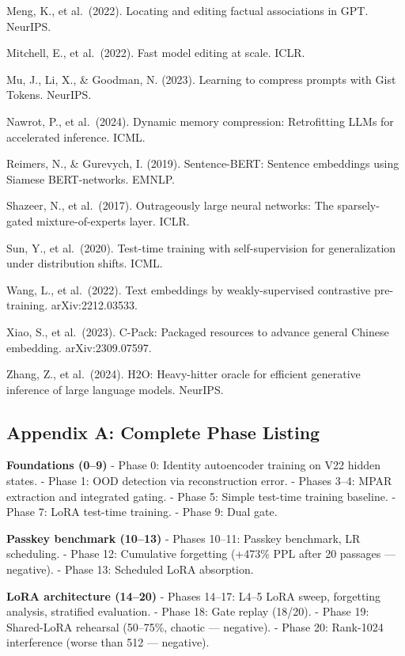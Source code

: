Meng, K., et al.~(2022). Locating and editing factual associations in GPT. NeurIPS.

Mitchell, E., et al.~(2022). Fast model editing at scale. ICLR.

Mu, J., Li, X., \& Goodman, N. (2023). Learning to compress prompts with Gist Tokens. NeurIPS.

Nawrot, P., et al.~(2024). Dynamic memory compression: Retrofitting LLMs for accelerated inference. ICML.

Reimers, N., \& Gurevych, I. (2019). Sentence-BERT: Sentence embeddings using Siamese BERT-networks. EMNLP.

Shazeer, N., et al.~(2017). Outrageously large neural networks: The sparsely-gated mixture-of-experts layer. ICLR.

Sun, Y., et al.~(2020). Test-time training with self-supervision for generalization under distribution shifts. ICML.

Wang, L., et al.~(2022). Text embeddings by weakly-supervised contrastive pre-training. arXiv:2212.03533.

Xiao, S., et al.~(2023). C-Pack: Packaged resources to advance general Chinese embedding. arXiv:2309.07597.

Zhang, Z., et al.~(2024). H2O: Heavy-hitter oracle for efficient generative inference of large language models. NeurIPS.

\subsection{Appendix A: Complete Phase Listing}\label{appendix-a-complete-phase-listing}

\textbf{Foundations (0--9)} - Phase 0: Identity autoencoder training on V22 hidden states. - Phase 1: OOD detection via reconstruction error. - Phases 3--4: MPAR extraction and integrated gating. - Phase 5: Simple test-time training baseline. - Phase 7: LoRA test-time training. - Phase 9: Dual gate.

\textbf{Passkey benchmark (10--13)} - Phases 10--11: Passkey benchmark, LR scheduling. - Phase 12: Cumulative forgetting (+473\% PPL after 20 passages --- negative). - Phase 13: Scheduled LoRA absorption.

\textbf{LoRA architecture (14--20)} - Phases 14--17: L4--5 LoRA sweep, forgetting analysis, stratified evaluation. - Phase 18: Gate replay (18/20). - Phase 19: Shared-LoRA rehearsal (50--75\%, chaotic --- negative). - Phase 20: Rank-1024 interference (worse than 512 --- negative).

